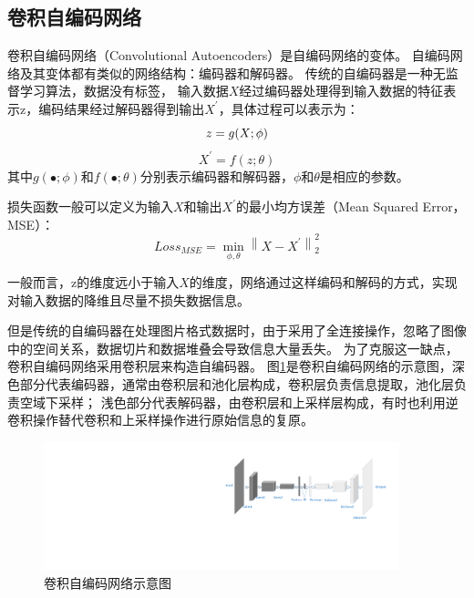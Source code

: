 \subsection{卷积自编码网络}
卷积自编码网络（Convolutional Autoencoders）是自编码网络\cite{Bengio2013Representation}的变体。
自编码网络及其变体都有类似的网络结构：编码器和解码器。
传统的自编码器是一种无监督学习算法，数据没有标签，
输入数据$X$经过编码器处理得到输入数据的特征表示z，编码结果经过解码器得到输出$X^{\prime}$，具体过程可以表示为：
\begin{equation}
z=g(X ; \phi) 
\vspace{-0.2cm}
\end{equation}
\begin{equation}
X^{\prime}=f(z ; \theta)
\end{equation}
其中$g(\bullet ; \phi)$和$f(\bullet ; \theta)$分别表示编码器和解码器，$\phi$和$\theta$是相应的参数。

损失函数一般可以定义为输入$X$和输出$X^{\prime}$的最小均方误差（Mean Squared Error，MSE）：
\begin{equation}
Loss_{MSE} = \min _{\phi, \theta}\left\|X-X^{\prime}\right\|_{2}^{2}
\end{equation}

一般而言，z的维度远小于输入$X$的维度，网络通过这样编码和解码的方式，实现对输入数据的降维且尽量不损失数据信息。

但是传统的自编码器在处理图片格式数据时，由于采用了全连接操作，忽略了图像中的空间关系，数据切片和数据堆叠会导致信息大量丢失。
为了克服这一缺点，卷积自编码网络采用卷积层来构造自编码器。
图\ref{fig:CAE}是卷积自编码网络的示意图，深色部分代表编码器，通常由卷积层和池化层构成，卷积层负责信息提取，池化层负责空域下采样；
浅色部分代表解码器，由卷积层和上采样层构成，有时也利用逆卷积操作替代卷积和上采样操作进行原始信息的复原。

\begin{figure}[htp]
	\centering
	\includegraphics[width=0.92\textwidth]{figures/CAE.pdf}
	\caption{卷积自编码网络示意图}
	\label{fig:CAE}
\end{figure}

